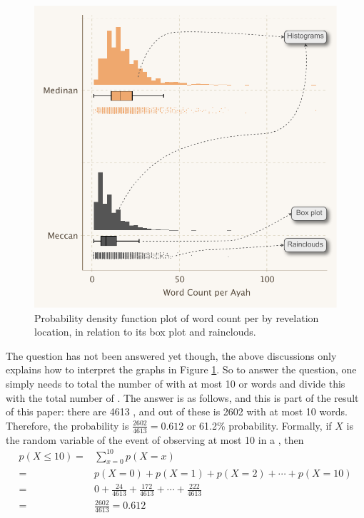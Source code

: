 \begin{exmp}
\begin{figure}[!t]
    \includegraphics[width=\textwidth]{img/plot3.pdf}
    \caption{Probability density function plot of word count per   by revelation location, in relation to its box plot and rainclouds.}
    \label{fig:meccan_medinan_word_count_per_ayah}
\end{figure}

The question has not been answered yet though, the above discussions only explains how to interpret the graphs in Figure \ref{fig:meccan_medinan_word_count_per_ayah}. So to answer the question, one simply needs to total the number of   with at most 10   or words and divide this with the total number of  . The answer is as follows, and this is part of the result of this paper: there are 4613  , and out of these is 2602   with at most 10 words. Therefore, the probability is $\frac{2602}{4613}=0.612$ or 61.2\% probability. Formally, if $X$ is the random variable of the event of observing at most 10   in a  , then 
\begin{align}
     p(X\leq 10)=&\sum_{x=0}^{10} p(X=x)\label{ex_eq:prob_lesseq_10}\\
    =& p(X=0)+ p(X=1)+ p(X=2)+\cdots+ p(X=10)\label{ex_eq:freq_dist_prob1..10}\\
    =&0+\frac{24}{4613}+\frac{172}{4613}+\cdots+\frac{222}{4613}\label{ex_eq:freq_dist_probval1..10}\\
    =&\frac{2602}{4613}=0.612\label{ex_eq:prob_0612}
\end{align}


\end{exmp}
